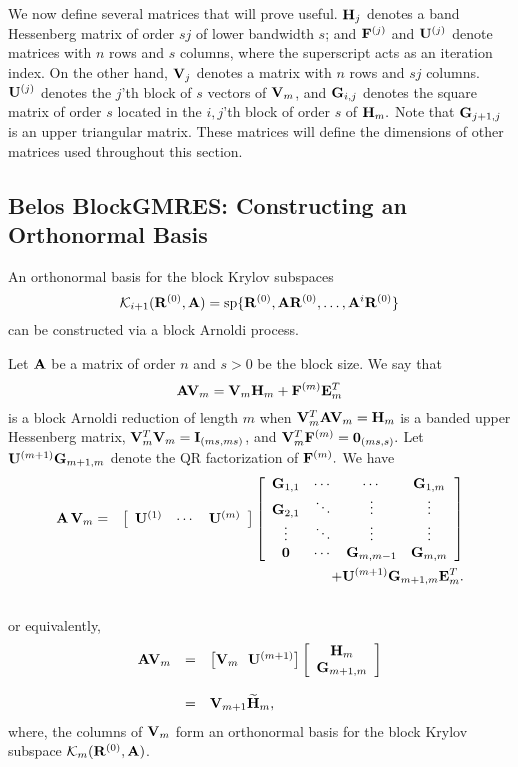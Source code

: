 \documentclass{article}
\newcommand{\bA}{{\bf A}}
\newcommand{\bE}{{\bf E}}
\newcommand{\bF}{{\bf F}}
\newcommand{\bG}{{\bf G}}
\newcommand{\bH}{{\bf H}}
\newcommand{\bR}{{\bf R}}
\newcommand{\bU}{{\bf U}}
\newcommand{\bV}{{\bf V}}
\newcommand{\dm}{\begin{displaymath}}
\newcommand{\edm}{\end{displaymath}}
\begin{document}
We now define several matrices that will prove useful.  $\bH_j$
denotes a band Hessenberg matrix of order $sj$ of lower bandwidth
$s$; and $\bF^{(j)}$ and $\bU^{(j)}$ denote matrices with $n$ rows
and $s$ columns, where the superscript acts as an iteration index.
On the other hand, $\bV_j$ denotes a matrix with $n$ rows and $sj$
columns. $\bU^{(j)}$ denotes the $j$'th block of $s$ vectors of
$\bV_m$, and $\bG_{i,j}$ denotes the square matrix of order $s$
located in the $i,j$'th block of order $s$ of $\bH_m.$ Note that
$\bG_{j+1,j}$ is an upper triangular matrix. These matrices will
define the dimensions of other matrices used throughout this
section.


\subsection{Belos BlockGMRES: Constructing an Orthonormal Basis}
\label{sec:blkarn}

An orthonormal basis for the block Krylov subspaces
 \dm
 {\cal K}_{i+1}(\bR^{(0)}, \bA) = {\rm sp} \{ \bR^{(0)}, \bA
 \bR^{(0)}, \ldots, \bA^i \bR^{(0)} \}
 \edm
can be constructed via a block Arnoldi process.

 Let $\bA $ be a matrix of order $n$ and $s > 0$ be the block size.
 We say that
 \begin{equation}
 \bA \bV_m = \bV_m \bH_m + \bF^{(m)} \bE^T_m \label{eq:blk_arn_red}
 \end{equation}
is a block Arnoldi reduction of length $m$ when
$\bV_m^T\bA\bV_m=\bH_m$ is a banded upper Hessenberg matrix,
$\bV_m^T\bV_m={\bf I}_{(m s,m s)}$, and $\bV_m^T\bF^{(m)}={\bf
0}_{(ms,s)}.$ Let $\bU^{(m+1)} \bG_{m+1,m}$ denote the QR
factorization of $\bF^{(m)}.$ We have
\begin{eqnarray*}
\bA \, \bV_m
     &=& \left[\begin{array}{ccc}
         \bU^{(1)} & \cdots & \bU^{(m)} \end{array}\right]
    \left[\begin{array}{cccc}
      \bG_{1,1}&\cdots& \cdots & \bG_{1,m}\\
      \bG_{2,1}&  \ddots& \vdots & \vdots \\
       \vdots & \ddots & \vdots & \vdots \\
     {\bf 0}& \cdots &  \bG_{m,m-1} & \bG_{m,m} \end{array}\right]\\
    & & + \bU^{(m+1)} \bG_{m+1,m}\bE_m^T. \\ \label{block_not} \nonumber
\end{eqnarray*}
or equivalently,
 \dm
 \begin{array}{rcl}
 \bA \bV_m &=& \left[ \bV_m ~~ \bU^{(m+1)} \right] \left[
 \begin{array}{c}
 \bH_m \\
 \bG_{m+1,m} \end{array} \right] \\ \\
 ~&=& \bV_{m+1} {\widetilde \bH}_m,
 \end{array}
 \edm
where, the columns of $\bV_m$ form an orthonormal basis for the
block Krylov subspace ${\cal K}_m ( \bR^{(0)}, \bA)$.
\end{document}
